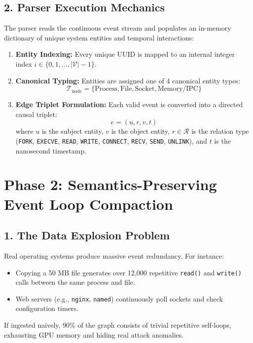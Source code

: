 \documentclass[11pt,a4paper]{report}
\begin{document}
\subsection{2. Parser Execution Mechanics}
The parser reads the continuous event stream and populates an in-memory dictionary of unique system entities and temporal interactions:
\begin{enumerate}
    \item \textbf{Entity Indexing:} Every unique UUID is mapped to an internal integer index $i \in \{0, 1, \dots, |\mathcal{V}|-1\}$.
    \item \textbf{Canonical Typing:} Entities are assigned one of 4 canonical entity types:
    $$\mathcal{T}_{\text{node}} = \{\text{Process}, \text{File}, \text{Socket}, \text{Memory/IPC}\}$$
    \item \textbf{Edge Triplet Formulation:} Each valid event is converted into a directed causal triplet:
    $$e = (u, r, v, t)$$
    where $u$ is the subject entity, $v$ is the object entity, $r \in \mathcal{R}$ is the relation type (\texttt{FORK}, \texttt{EXECVE}, \texttt{READ}, \texttt{WRITE}, \texttt{CONNECT}, \texttt{RECV}, \texttt{SEND}, \texttt{UNLINK}), and $t$ is the nanosecond timestamp.
\end{enumerate}

\section{Phase 2: Semantics-Preserving Event Loop Compaction}

\subsection{1. The Data Explosion Problem}
Real operating systems produce massive event redundancy. For instance:
\begin{itemize}
    \item Copying a 50 MB file generates over 12,000 repetitive \texttt{read()} and \texttt{write()} calls between the same process and file.
    \item Web servers (e.g., \texttt{nginx}, \texttt{named}) continuously poll sockets and check configuration timers.
\end{itemize}
If ingested naively, 90\% of the graph consists of trivial repetitive self-loops, exhausting GPU memory and hiding real attack anomalies.
\end{document}
